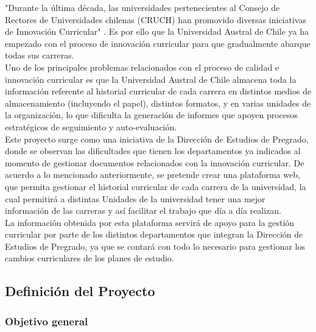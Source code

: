 	"Durante la última década, las universidades pertenecientes al Consejo de Rectores de Universidades chilenas (CRUCH) 
	han promovido diversas iniciativas de Innovación Curricular"\hspace{0.2cm} \cite{INN11}. Es por ello que la Universidad Austral de 
	Chile ya ha empezado con el proceso de innovación curricular para que gradualmente abarque todas sus carreras.
	\\
	
	Uno de los principales problemas relacionados con el proceso de calidad e innovación curricular es que la Universidad 
	Austral de Chile almacena toda la información referente al historial curricular de cada carrera en distintos medios 
	de almacenamiento (incluyendo el papel), distintos  formatos, y en varias unidades de la organización, lo que 
	dificulta la generación de informes que apoyen procesos estratégicos de seguimiento y auto-evaluación.
	\\
	
	Este proyecto surge como una iniciativa de la Dirección de Estudios de Pregrado, donde se observan las dificultades que tienen los 
	departamentos ya indicados al momento de gestionar documentos relacionados con la innovación curricular.  
	De acuerdo a lo mencionado anteriormente, se pretende crear una plataforma web, que permita gestionar el historial 
	curricular de cada carrera de la universidad, la cual permitirá a distintas Unidades de la universidad tener una 
	mejor información  de las carreras y así facilitar el trabajo que día a día realizan.
	\\
	
	La información obtenida por esta plataforma servirá de apoyo para la gestión curricular por parte de los distintos departamentos que integran la Dirección de Estudios de Pregrado, ya que se contará con todo lo necesario para gestionar los cambios curriculares de los planes de estudio.
	\\


	\subsection{Definición del Proyecto}
	
	\subsubsection{Objetivo general}
	
